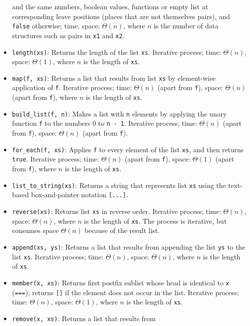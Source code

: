 \begin{itemize}
  and the same numbers, boolean values, functions or empty list
  at corresponding leave positions (places that are not themselves pairs),
  and \lstinline{false} otherwise; time, space:
  $Θ(n)$, where $n$ is the number of data structures such as pairs
  in \lstinline{x1} and \lstinline{x2}.
\item \lstinline{length(xs)}: Returns the length of the list
  \lstinline{xs}. 
Iterative process; time: $Θ(n)$, space: $Θ(1)$, where $n$ is the length of \lstinline{xs}.
\item \lstinline{map(f, xs)}: Returns a list that results from list
  \lstinline{xs} by element-wise application of \lstinline{f}. 
Iterative process; time: $Θ(n)$ (apart from \lstinline{f}), space: $Θ(n)$ (apart from \lstinline{f}), where $n$ is the length of \lstinline{xs}.
\item \lstinline{build_list(f, n)}: Makes a list with \lstinline{n}
elements by applying the unary function \lstinline{f} to the numbers 0 to \lstinline{n - 1}.
Iterative process; time: $Θ(n)$ (apart from \lstinline{f}), space: $Θ(n)$ (apart from \lstinline{f}).
\item \lstinline{for_each(f, xs)}: Applies \lstinline{f} to every
  element of the list \lstinline{xs}, and then returns
  \lstinline{true}. 
Iterative process; time: $Θ(n)$ (apart from \lstinline{f}), space: $Θ(1)$ (apart from \lstinline{f}), where $n$ is the length of \lstinline{xs}.
\item \lstinline{list_to_string(xs)}: Returns a string that represents
list \lstinline{xs} using the text-based box-and-pointer notation \lstinline{[...]}.
\item \lstinline{reverse(xs)}: Returns list \lstinline{xs} in reverse
  order. Iterative process; time: $Θ(n)$, space: $Θ(n)$, where $n$ is the length of \lstinline{xs}.
The process is iterative, but consumes space $Θ(n)$ because of the result list.
\item \lstinline{append(xs, ys)}: Returns a list that results from 
appending the list \lstinline{ys} to the list \lstinline{xs}.
Iterative process; time: $Θ(n)$, space: $Θ(n)$, where $n$ is the length of \lstinline{xs}.
\item \lstinline{member(x, xs)}: Returns first postfix sublist
whose head is identical to
\lstinline{x} (\lstinline{===}); returns \lstinline{[]} if the
element does not occur in the list.
Iterative process; time: $Θ(n)$, space: $Θ(1)$, where $n$ is the length of \lstinline{xs}.
\item \lstinline{remove(x, xs)}: Returns a list that results from

\end{itemize}
